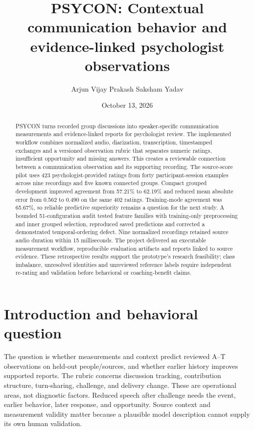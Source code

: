 \documentclass{article}
\title{PSYCON: Contextual communication behavior and evidence-linked psychologist observations}
\author{Arjun Vijay Prakash \And Saksham Yadav}
\date{October 13, 2026}
\begin{document}
\maketitle
\begin{abstract}
PSYCON turns recorded group discussions into speaker-specific communication measurements and evidence-linked reports for psychologist review. The implemented workflow combines normalized audio, diarization, transcription, timestamped exchanges and a versioned observation rubric that separates numeric ratings, insufficient opportunity and missing answers. This creates a reviewable connection between a communication observation and its supporting recording. The source-score pilot uses 423 psychologist-provided ratings from forty participant-session examples across nine recordings and five known connected groups. Compact grouped development improved agreement from 57.21\% to 62.19\% and reduced mean absolute error from 0.562 to 0.490 on the same 402 ratings. Training-mode agreement was 65.67\%, so reliable predictive superiority remains a question for the next study. A bounded 51-configuration audit tested feature families with training-only preprocessing and inner grouped selection, reproduced saved predictions and corrected a demonstrated temporal-ordering defect. Nine normalized recordings retained source audio duration within 15 milliseconds. The project delivered an executable measurement workflow, reproducible evaluation artifacts and reports linked to source evidence. These retrospective results support the prototype's research feasibility; class imbalance, unresolved identities and unreviewed reference labels require independent re-rating and validation before behavioral or coaching-benefit claims.
\end{abstract}

\section{Introduction and behavioral question}
The question is whether measurements and context predict reviewed A--T observations on held-out people/sources, and whether earlier history improves supported reports. The rubric concerns discussion tracking, contribution structure, turn-sharing, challenge, and delivery change. These are operational areas, not diagnostic factors. Reduced speech after challenge needs the event, earlier behavior, later response, and opportunity. Source context and measurement validity matter because a plausible model description cannot supply its own human validation.
\end{document}
